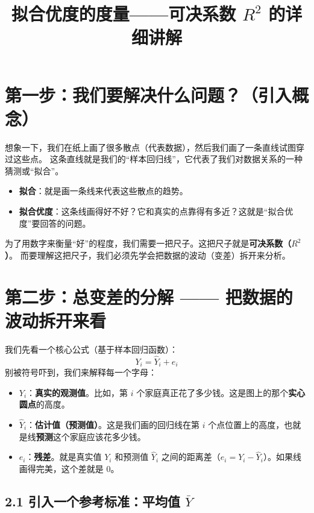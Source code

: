 \documentclass[12pt,a4paper]{article}
\title{\heiti 拟合优度的度量——可决系数 \(R^2\) 的详细讲解}
\author{}
\date{}
\begin{document}
\maketitle

\section*{第一步：我们要解决什么问题？（引入概念）}

想象一下，我们在纸上画了很多散点（代表数据），然后我们画了一条直线试图穿过这些点。
这条直线就是我们的“样本回归线”，它代表了我们对数据关系的一种猜测或“拟合”。

\begin{itemize}[itemsep=0pt,topsep=0pt]
    \item \textbf{拟合}：就是画一条线来代表这些散点的趋势。
    \item \textbf{拟合优度}：这条线画得好不好？它和真实的点靠得有多近？这就是“拟合优度”要回答的问题。
\end{itemize}

为了用数字来衡量“好”的程度，我们需要一把尺子。这把尺子就是\textbf{可决系数（\(R^2\)）}。
而要理解这把尺子，我们必须先学会把数据的波动（变差）拆开来分析。

\section*{第二步：总变差的分解 —— 把数据的波动拆开来看}

我们先看一个核心公式（基于样本回归函数）：
\begin{equation}
    Y_i = \hat{Y}_i + e_i
\end{equation}
别被符号吓到，我们来解释每一个字母：
\begin{itemize}[itemsep=0pt,topsep=0pt]
    \item \(Y_i\)：\textbf{真实的观测值}。比如，第 \(i\) 个家庭真正花了多少钱。这是图上的那个\textbf{实心圆点}的高度。
    \item \(\hat{Y}_i\)：\textbf{估计值（预测值）}。这是我们画的回归线在第 \(i\) 个点位置上的高度，也就是线\textbf{预测}这个家庭应该花多少钱。
    \item \(e_i\)：\textbf{残差}。就是真实值 \(Y_i\) 和预测值 \(\hat{Y}_i\) 之间的距离差（\(e_i = Y_i - \hat{Y}_i\)）。如果线画得完美，这个差就是 0。
\end{itemize}

\subsection*{2.1 引入一个参考标准：平均值 \(\bar{Y}\)}
\end{document}
